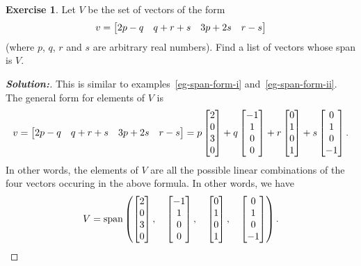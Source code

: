 \documentclass[a4paper]{amsart}
\theoremstyle{definition}
\newtheorem{exercise}{Exercise}
\newenvironment{solution}{\begin{proof}[\textbf{Solution:}] \vphantom{u}}{\end{proof}}
\begin{document}
\begin{exercise}\label{ex-span-form-i}
 Let $V$ be the set of vectors of the form
 \[ v = \left[\begin{matrix} 2p-q  & q+r+s & 3p+2s & r-s \end{matrix}\right] \]
 (where $p$, $q$, $r$ and $s$ are arbitrary real numbers).  Find a
 list of vectors whose span is $V$.
\end{exercise}
\begin{solution}
 This is similar to examples~\ref{eg-span-form-i}
 and~\ref{eg-span-form-ii}.  The general form for elements of $V$ is 
 \[ v = \left[\begin{matrix} 2p-q  & q+r+s & 3p+2s & r-s \end{matrix}\right]
      = p \left[\begin{matrix}  2\\0\\3\\ 0 \end{matrix}\right] + 
        q \left[\begin{matrix} -1\\1\\0\\ 0 \end{matrix}\right] +
        r \left[\begin{matrix}  0\\1\\0\\ 1 \end{matrix}\right] +
        s \left[\begin{matrix}  0\\1\\0\\-1 \end{matrix}\right].
 \]
 In other words, the elements of $V$ are all the possible linear
 combinations of the four vectors occuring in the above formula.  In
 other words, we have 
 \[ V = \operatorname{span}\left(
        \left[\begin{matrix}  2\\0\\3\\ 0 \end{matrix}\right] ,\quad
        \left[\begin{matrix} -1\\1\\0\\ 0 \end{matrix}\right] ,\quad
        \left[\begin{matrix}  0\\1\\0\\ 1 \end{matrix}\right] ,\quad
        \left[\begin{matrix}  0\\1\\0\\-1 \end{matrix}\right] 
        \right).
 \]
\end{solution}
\end{document}
